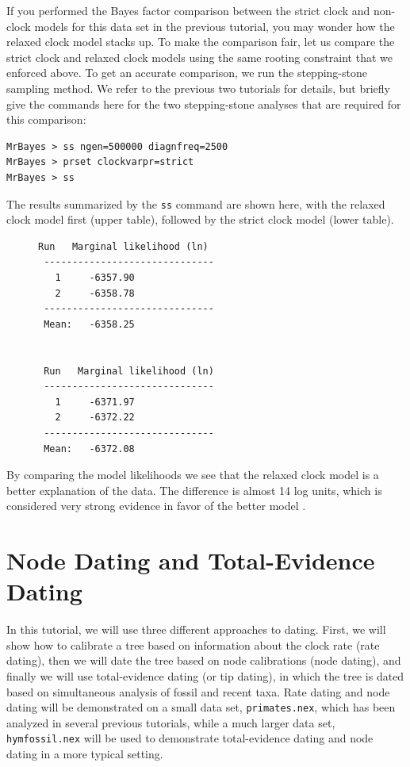 \documentclass[12pt]{book}
\begin{document}
If you performed the Bayes factor comparison between the strict clock and non-clock models for this
data set in the previous tutorial, you may wonder how the relaxed clock model stacks up. To make
the comparison fair, let us compare the strict clock and relaxed clock models using the same
rooting constraint that we enforced above. To get an accurate comparison, we run the stepping-stone
sampling method. We refer to the previous two tutorials for details, but briefly give the commands
here for the two stepping-stone analyses that are required for this comparison:

\begin{Verbatim}
MrBayes > ss ngen=500000 diagnfreq=2500
MrBayes > prset clockvarpr=strict
MrBayes > ss
\end{Verbatim}

The results summarized by the \texttt{ss} command are shown here, with the relaxed clock model
first (upper table), followed by the strict clock model (lower table).

\begin{figure}[h]
\centering
\begin{BVerbatim}
Run   Marginal likelihood (ln)
 ------------------------------
   1     -6357.90
   2     -6358.78
 ------------------------------
 Mean:   -6358.25


 Run   Marginal likelihood (ln)
 ------------------------------
   1     -6371.97
   2     -6372.22
 ------------------------------
 Mean:   -6372.08
\end{BVerbatim}
\end{figure}

By comparing the model likelihoods we see that the relaxed clock model is a better explanation of
the data. The difference is almost 14 log units, which is considered very strong evidence in favor
of the better model \citep{kass95}.

\section{Node Dating and Total-Evidence Dating}

In this tutorial, we will use three different approaches to dating. First, we will show how to
calibrate a tree based on information about the clock rate (rate dating), then we will date the
tree based on node calibrations (node dating), and finally we will use total-evidence dating (or
tip dating), in which the tree is dated based on simultaneous analysis of fossil and recent taxa.
Rate dating and node dating will be demonstrated on a small data set, \texttt{primates.nex}, which
has been analyzed in several previous tutorials, while a much larger data set,
\texttt{hymfossil.nex} will be used to demonstrate total-evidence dating and node dating in a more
typical setting.
\end{document}
